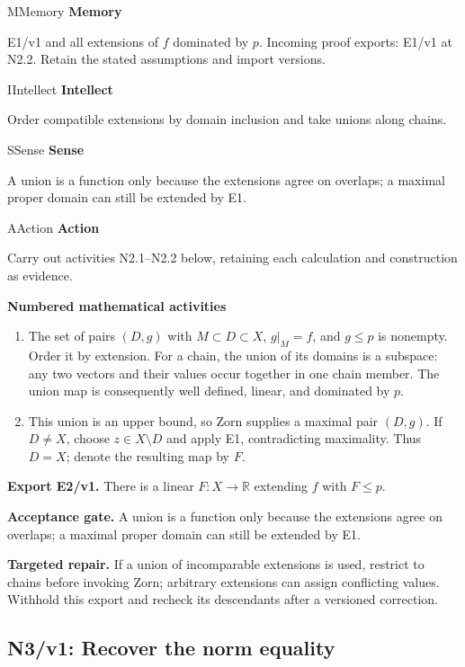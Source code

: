 \documentclass[preprint,12pt,aps,pra,showkeys,amsmath,amssymb,superscriptaddress,floatfix]{revtex4-2}
\theoremstyle{definition}
\theoremstyle{remark}
\newcommand{\mmfaculty}[3]{%
 \begin{mmfacultybox}{#1}{#2}
 {\sffamily\bfseries\color{MMBlue}#2}\par\smallskip #3
 \end{mmfacultybox}}
\newcommand{\field}[2]{\par\smallskip\noindent\textbf{#1.} #2\par}
\begin{document}
\mmfaculty{M}{Memory}{E1/v1 and all extensions of \(f\) dominated by \(p\). Incoming proof
exports: E1/v1 at N2.2. Retain the stated assumptions and import
versions.}

\mmfaculty{I}{Intellect}{Order compatible extensions by domain inclusion and take unions along
chains.}

\mmfaculty{S}{Sense}{A union is a function only because the extensions agree on overlaps; a
maximal proper domain can still be extended by E1.}

\mmfaculty{A}{Action}{Carry out activities N2.1--N2.2 below, retaining each calculation and
construction as evidence.}

\smallskip\noindent\textbf{Numbered mathematical activities}

\begin{enumerate}[label=N2.\arabic*,leftmargin=3.4em]

\item The set of pairs \((D,g)\) with \(M\subset D\subset X\), \(g|_M=f\), and
\(g\le p\) is nonempty. Order it by extension. For a chain, the union of
its domains is a subspace: any two vectors and their values occur
together in one chain member. The union map is consequently well
defined, linear, and dominated by \(p\).

\item This union is an upper bound, so Zorn supplies a maximal pair \((D,g)\).
If \(D\ne X\), choose \(z\in X\setminus D\) and apply E1, contradicting
maximality. Thus \(D=X\); denote the resulting map by \(F\).

\end{enumerate}

\field{Export E2/v1}{There is a linear \(F:X\to\mathbb R\) extending \(f\) with \(F\le p\).}

\field{Acceptance gate}{A union is a function only because the extensions agree on overlaps; a
maximal proper domain can still be extended by E1.}

\field{Targeted repair}{If a union of incomparable extensions is used, restrict to chains before
invoking Zorn; arbitrary extensions can assign conflicting values.
Withhold this export and recheck its descendants after a versioned
correction.}

\clearpage

\subsection{N3/v1: Recover the norm equality}
\end{document}
